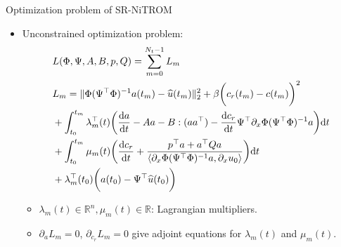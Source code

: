\documentclass[presentation]{beamer}
\begin{document}
\begin{frame}[label={sec:org86dea9e}]{Optimization problem of SR-NiTROM}
\begin{itemize}[<+->]
\item Unconstrained optimization problem:
\begin{align}
    & L(\Phi, \Psi, A, B, p, Q) = \sum_{m = 0}^{N_{t} - 1} L_{m}\notag\\
    & L_{m} = \|\Phi(\Psi^{\top}\Phi)^{-1}a(t_{m}) - \widehat{u}(t_{m})\|_{2}^{2} + \beta\bigg(c_{r}(t_{m}) - c(t_{m})\bigg)^{2}\notag\\
    &+ \int_{t_{0}}^{t_{m}}\lambda_{m}^{\top}(t)\bigg(\frac{\mathrm{d}a}{\mathrm{d}t} - Aa - B:(aa^{\top}) - \frac{\mathrm{d}c_{r}}{\mathrm{d}t}\Psi^{\top}\partial_{x}\Phi(\Psi^{\top}\Phi)^{-1}a\bigg)\mathrm{d}t\notag\\
    &+ \int_{t_{0}}^{t_{m}}\mu_{m}(t)\bigg(\frac{\mathrm{d}c_{r}}{\mathrm{d}t} + \frac{p^{\top}a + a^{\top}Qa}{\langle\partial_{x}\Phi(\Psi^{\top}\Phi)^{-1}a, \partial_{x}u_{0}\rangle}\bigg)\mathrm{d}t\notag\\
    &+ \lambda_{m}^{\top}(t_{0})\bigg(a(t_{0}) - \Psi^{\top}\widehat{u}(t_{0})\bigg)
\end{align}
\begin{itemize}
\item \(\lambda_{m}(t)\in\mathbb{R}^{n}, \mu_{m}(t)\in\mathbb{R}\): Lagrangian multipliers.
\item \(\partial_{a}L_{m} = 0\), \(\partial_{c_{r}}L_{m} = 0\) give adjoint equations for \(\lambda_{m}(t)\) and \(\mu_{m}(t)\).
\end{itemize}
\end{itemize}
\end{frame}
\end{document}
